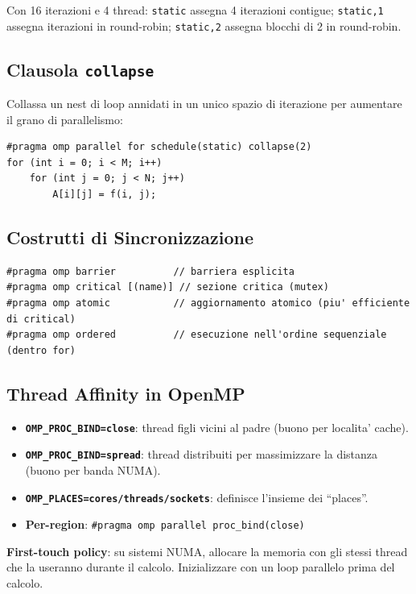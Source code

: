 \documentclass[11pt,a4paper]{article}
\theoremstyle{remark}
\begin{document}
Con 16 iterazioni e 4 thread: \lstinline|static| assegna 4 iterazioni contigue; \lstinline|static,1| assegna iterazioni in round-robin; \lstinline|static,2| assegna blocchi di 2 in round-robin.

\subsection{Clausola \texttt{collapse}}

Collassa un nest di loop annidati in un unico spazio di iterazione per aumentare il grano di parallelismo:
\begin{lstlisting}[style=cpp]
#pragma omp parallel for schedule(static) collapse(2)
for (int i = 0; i < M; i++)
    for (int j = 0; j < N; j++)
        A[i][j] = f(i, j);
\end{lstlisting}

\subsection{Costrutti di Sincronizzazione}

\begin{lstlisting}[style=cpp]
#pragma omp barrier          // barriera esplicita
#pragma omp critical [(name)] // sezione critica (mutex)
#pragma omp atomic           // aggiornamento atomico (piu' efficiente di critical)
#pragma omp ordered          // esecuzione nell'ordine sequenziale (dentro for)
\end{lstlisting}

\subsection{Thread Affinity in OpenMP}

\begin{itemize}
  \item \textbf{\texttt{OMP\_PROC\_BIND=close}}: thread figli vicini al padre (buono per localita' cache).
  \item \textbf{\texttt{OMP\_PROC\_BIND=spread}}: thread distribuiti per massimizzare la distanza (buono per banda NUMA).
  \item \textbf{\texttt{OMP\_PLACES=cores/threads/sockets}}: definisce l'insieme dei ``places''.
  \item \textbf{Per-region}: \lstinline|#pragma omp parallel proc_bind(close)|
\end{itemize}

\textbf{First-touch policy}: su sistemi NUMA, allocare la memoria con gli stessi thread che la useranno durante il calcolo. Inizializzare con un loop parallelo prima del calcolo.
\end{document}
